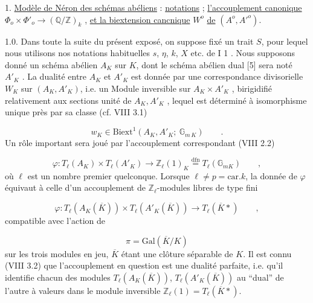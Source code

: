

1. \underline{Modèle de Néron des schémas abéliens} : \underline{notations} ; \underline{l'accouplement canonique} $\Phi_o \times \Phi'_o \longrightarrow (\mathbb{Q}/\mathbb{Z})_k$ , \underline{et la biextension cancnique} $W^o$ \underline{de} $(A^o,{A'}^{o})$.

1.0.  Dans toute la suite du présent exposé, on suppose fixé un trait $S$, pour lequel nous utilisons nos notations habituelles $s$, $\eta$, $k$, $X$ etc. de I 1 . Nous supposons donné un schéma abélien $A_K$ sur $K$, dont le schéma abélien dual [5] sera noté $A'_K$ . La dualité entre $A_K$ et $A'_K$ est donnée par une correspondance divisorielle $W_K$ sur $(A_K,A'_K)$, i.e. un Module inversible sur $A_K \times A'_K$ , birigidifié relativement aux sections unité de $A_K,A'_K$ , lequel est déterminé à isomorphisme unique près par sa classe (cf. VIII 3.1)

\begin{equation}\tag{1.0.1}
w_K \in \mathrm{Biext}^1(A_K,A'_K;\ \mathbb{G}_{m\,K}) \qquad .
\end{equation}
Un rôle important sera joué par l'accouplement correspondant (VIII 2.2)

\begin{equation}\tag{1.0.2}
\varphi : T_\ell(A_K) \times T_\ell(A'_K) \longrightarrow \mathbb{Z}_\ell(1)_K \overset{\mathrm{dfn}}{=} T_\ell(\mathbb{G}_{mK}) \qquad ,
\end{equation}
où $\ell$ est un nombre premier quelconque. Lorsque $\ell \neq p = \mathrm{car}.k$, la donnée de $\varphi$ équivaut à celle d'un accouplement de $\mathbb{Z}_\ell$-modules libres de type fini

\begin{equation}\tag{1.0.3}
\varphi : T_\ell(A_K(\overline{K})) \times T_\ell(A'_K(\overline{K})) \longrightarrow T_\ell(\overline{K}*) \qquad ,
\end{equation}
compatible avec l'action de

\begin{equation*}
\pi = \mathrm{Gal}(\overline{K}/K)
\end{equation*}
sur les trois modules en jeu, $\overline{K}$ étant une clôture séparable de $K$. Il est connu (VIII 3.2) que l'accouplement en question est une dualité parfaite, i.e.  qu'il  identifie chacun des modules $T_\ell(A_K(\overline{K}))$, $T_\ell(A'_K(\overline{K}))$ au ``dual'' de l'autre à valeurs dans le module inversible $\mathbb{Z}_\ell(1) = T_\ell(\overline{K}*)$.


